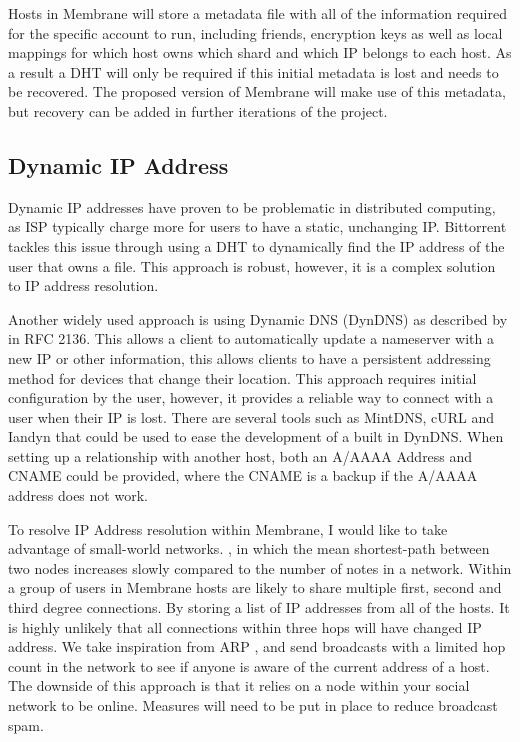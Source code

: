 \documentclass[11pt, a4paper, twocolumn, twoside]{report}
\begin{document}
Hosts in Membrane will store a metadata file with all of the information required for the specific account to run, including friends, encryption keys as well as local mappings for which host owns which shard and which IP belongs to each host. As a result a DHT will only be required if this initial metadata is lost and needs to be recovered. The proposed version of Membrane will make use of this metadata, but recovery can be added in further iterations of the project.

\subsection{Dynamic IP Address}

Dynamic IP addresses have proven to be problematic in distributed computing, as ISP typically charge more for users to have a static, unchanging IP. Bittorrent tackles this issue through using a DHT to dynamically find the IP address of the user that owns a file. This approach is robust, however, it is a complex solution to IP address resolution.

Another widely used approach is using Dynamic DNS (DynDNS) as described by \cite{bound1997dynamic} in RFC 2136. This allows a client to automatically update a nameserver with a new IP or other information, this allows clients to have a persistent addressing method for devices that change their location. This approach requires initial configuration by the user, however, it provides a reliable way to connect with a user when their IP is lost. There are several tools such as MintDNS, cURL and Iandyn that could be used to ease the development of a built in DynDNS. When setting up a relationship with another host, both an A/AAAA Address and CNAME could be provided, where the CNAME is a backup if the A/AAAA address does not work.

To resolve IP Address resolution within Membrane, I would like to take advantage of small-world networks. \citep{porter2012small}, in which the mean shortest-path between two nodes increases slowly compared to the number of notes in a network. Within a group of users in Membrane hosts are likely to share multiple first, second and third degree connections. By storing a list of IP addresses from all of the hosts. It is highly unlikely that all connections within three hops will have changed IP address. We take inspiration from ARP \citep{plummer1982ethernet}, and send broadcasts with a limited hop count in the network to see if anyone is aware of the current address of a host. The downside of this approach is that it relies on a node within your social network to be online. Measures will need to be put in place to reduce broadcast spam.
\end{document}
